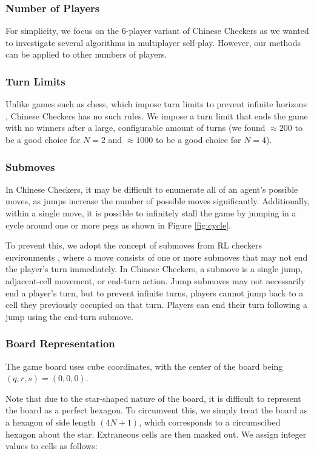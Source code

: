\documentclass[12pt, a4paper, twocolumn]{article}
\begin{document}
\subsubsection{Number of Players}

For simplicity, we focus on the 6-player variant of Chinese Checkers as we wanted to investigate several algorithms in multiplayer self-play. However, our methods can be applied to other numbers of players.

\subsubsection{Turn Limits}

Unlike games such as chess, which impose turn limits to prevent infinite horizons \cite{ChessTurnLimit}, Chinese Checkers has no such rules. We impose a turn limit that ends the game with no winners after a large, configurable amount of turns (we found $\approx 200$ to be a good choice for $N=2$ and $\approx 1000$ to be a good choice for $N=4$).

\subsubsection{Submoves}

In Chinese Checkers, it may be difficult to enumerate all of an agent's possible moves, as jumps increase the number of possible moves significantly. Additionally, within a single move, it is possible to infinitely stall the game by jumping in a cycle around one or more pegs as shown in Figure \ref{fig:cycle}.

To prevent this, we adopt the concept of submoves from RL checkers environments \cite{RLCheckers}, where a move consists of one or more submoves that may not end the player's turn immediately. In Chinese Checkers, a submove is a single jump, adjacent-cell movement, or end-turn action. Jump submoves may not necessarily end a player's turn, but to prevent infinite turns, players cannot jump back to a cell they previously occupied on that turn. Players can end their turn following a jump using the end-turn submove.

\subsubsection{Board Representation}
The game board uses cube coordinates, with the center of the board being $(q, r, s) = (0, 0, 0)$.

Note that due to the star-shaped nature of the board, it is difficult to represent the board as a perfect hexagon. To circumvent this, we simply treat the board as a hexagon of side length $(4N+1)$, which corresponds to a circumscibed hexagon about the star. Extraneous cells are then masked out. We assign integer values to cells as follows:
\end{document}
